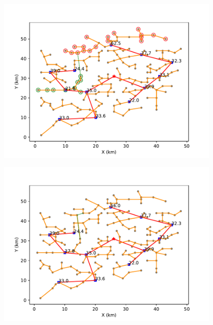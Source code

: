 \documentclass{cumcmthesis}
\begin{document}
  \begin{figure}[!h]
    \centering
    \begin{minipage}[c]{0.45\textwidth}
        \centering
        \includegraphics[width=0.99\textwidth]{figure/pipline_graft_connection_5.pdf}
        \label{fig:pipline_graft_connection_5}
    \end{minipage}
    \begin{minipage}[c]{0.45\textwidth}
        \centering
        \includegraphics[width=0.99\textwidth]{figure/pipline_graft_cut_5.pdf}
        \label{fig:pipline_graft_cut_5}
    \end{minipage}
  \end{figure}
  
\end{document}
